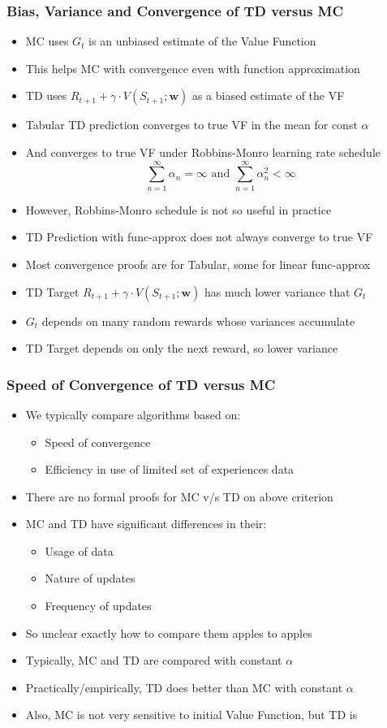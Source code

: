 \documentclass[handout]{beamer}
\begin{document}
\begin{frame}
\frametitle{Bias, Variance and Convergence of TD versus MC}
\pause
\begin{itemize}[<+->]
\item MC uses $G_t$ is an unbiased estimate of the Value Function
\item This helps MC with convergence even with function approximation
\item TD uses $R_{t+1} + \gamma \cdot V(S_{t+1};\bm{w})$ as a biased estimate of the VF
\item Tabular TD prediction converges to true VF in the mean for const $\alpha$
\item And converges to true VF under Robbins-Monro learning rate schedule
$$\sum_{n=1}^{\infty} \alpha_n = \infty \text{ and } \sum_{n=1}^{\infty} \alpha_n^2 < \infty$$
\item However, Robbins-Monro schedule is not so useful in practice
\item TD Prediction with func-approx does not always converge to true VF
\item Most convergence proofs are for Tabular, some for linear func-approx
\item TD Target $R_{t+1} + \gamma \cdot V(S_{t+1}; \bm{w})$ has much lower variance that $G_t$
\item $G_t$ depends on many random rewards whose variances accumulate
\item TD Target depends on only the next reward, so lower variance
\end{itemize}
\end{frame}

\begin{frame}
\frametitle{Speed of Convergence of TD versus MC}
\pause
\begin{itemize}[<+->]
\item We typically compare algorithms based on:
\begin{itemize}[<+->]
\item Speed of convergence
\item Efficiency in use of limited set of experiences data
\end{itemize}
\item There are no formal proofs for MC v/s TD on above criterion
\item MC and TD have significant differences in their:
\begin{itemize}[<+->]
\item Usage of data
\item Nature of updates
\item Frequency of updates
\end{itemize}
\item So unclear exactly how to compare them apples to apples
\item Typically, MC and TD are compared with constant $\alpha$
\item Practically/empirically, TD does better than MC with constant $\alpha$
\item Also, MC is not very sensitive to initial Value Function, but TD is
\end{itemize}
\end{frame}
\end{document}
